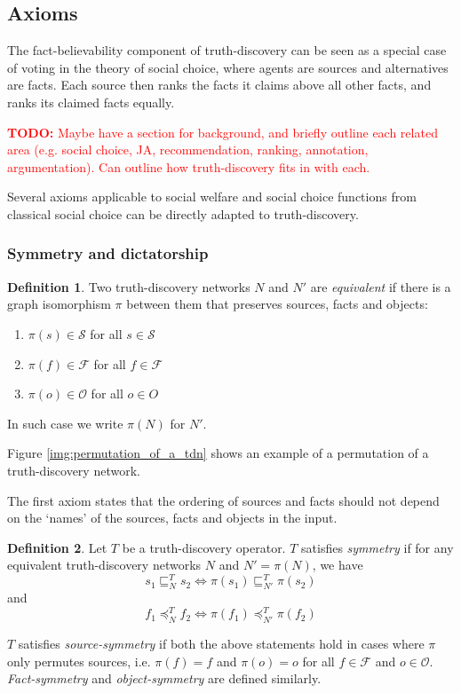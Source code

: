 \documentclass{article}
\theoremstyle{definition} \newtheorem{definition}{Definition}
\theoremstyle{definition} \newtheorem{example}{Example}
\theoremstyle{plain} \newtheorem{axiom}{Axiom}
\theoremstyle{plain} \newtheorem*{remark}{Remark}
\theoremstyle{remark} \newtheorem*{notation}{Notation}
\theoremstyle{plain} \newtheorem{lemma}{Lemma}
\theoremstyle{plain} \newtheorem{theorem}{Theorem}
\theoremstyle{plain} \newtheorem{proposition}{Proposition}
\newcommand{\todo}[1] {
    \textcolor{red}{
        \textbf{TODO:} #1
    }
}
\renewcommand{\S}{\mathcal{S}}  %
\renewcommand{\O}{\mathcal{O}}  %
\newcommand{\F}{\mathcal{F}}
\newcommand{\sle}{\sqsubseteq}
\newcommand{\fle}{\preceq}
\begin{document}
\subsection{Axioms}
\label{sec:axioms}

The fact-believability component of truth-discovery can be seen as a special
case of voting in the theory of social choice, where agents are sources and
alternatives are facts. Each source then ranks the facts it claims above all
other facts, and ranks its claimed facts equally.\footnotemark

\todo{
    Maybe have a section for background, and briefly outline each related area
    (e.g. social choice, JA, recommendation, ranking, annotation,
    argumentation). Can outline how truth-discovery fits in with each.
}


Several axioms applicable to social welfare and social choice functions from
classical social choice can be directly adapted to truth-discovery.

\subsubsection{Symmetry and dictatorship}

\begin{definition}
Two truth-discovery networks $N$ and $N'$ are \emph{equivalent} if there is a
graph isomorphism $\pi$ between them that preserves sources, facts and objects:
\begin{enumerate}
\item $\pi(s) \in \S$ for all $s \in \S$
\item $\pi(f) \in \F$ for all $f \in \F$
\item $\pi(o) \in \O$ for all $o \in O$
\end{enumerate}

In such case we write $\pi(N)$ for $N'$.
\end{definition}

Figure \ref{img:permutation_of_a_tdn} shows an example of a permutation of a
truth-discovery network.

The first axiom states that the ordering of sources and facts should not depend
on the `names' of the sources, facts and objects in the input.

\begin{definition}
Let $T$ be a truth-discovery operator. $T$ satisfies \emph{symmetry} if for
any equivalent truth-discovery networks $N$ and $N' = \pi(N)$, we have
$$ s_1 \sle_N^T s_2 \iff \pi(s_1) \sle_{N'}^T \pi(s_2) $$
and
$$ f_1 \fle_N^T f_2 \iff \pi(f_1) \fle_{N'}^T \pi(f_2) $$

$T$ satisfies \emph{source-symmetry} if both the above statements hold in cases
where $\pi$ only permutes sources, i.e. $\pi(f)=f$ and $\pi(o)=o$ for all $f
\in \F$ and $o \in \O$. \emph{Fact-symmetry} and \emph{object-symmetry} are
defined similarly.
\end{definition}
\end{document}
